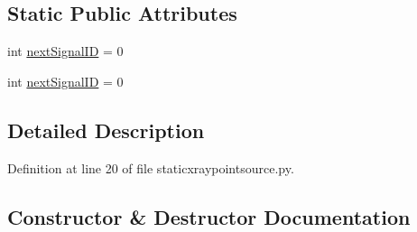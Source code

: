 \subsection*{Static Public Attributes}
\begin{DoxyCompactItemize}
\item 
int \hyperlink{classmodest_1_1signals_1_1signalsource_1_1SignalSource_a453eafb550b551adbec0903deb63dfce}{next\+Signal\+ID} = 0
\item 
int \hyperlink{classmodest_1_1signals_1_1signalsource_1_1SignalSource_a453eafb550b551adbec0903deb63dfce}{next\+Signal\+ID} = 0
\end{DoxyCompactItemize}


\subsection{Detailed Description}


Definition at line 20 of file staticxraypointsource.\+py.



\subsection{Constructor \& Destructor Documentation}
